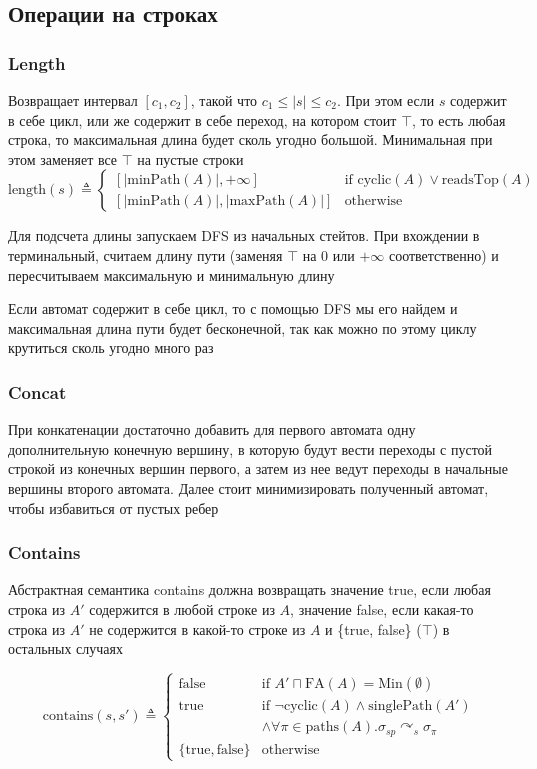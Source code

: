 \newpage
\subsection{Операции на строках}
\subsubsection*{Length}
Возвращает интервал $[c_1, c_2]$, такой что $c_1 \leq |s| \leq c_2$. При этом если $s$ содержит в себе цикл, или же содержит в себе переход, на котором стоит $\top$, то есть любая строка, то максимальная длина будет сколь угодно большой. Минимальная при этом заменяет все $\top$ на пустые строки
$$
\text{length}(s) \triangleq 
\begin{cases}
[\lvert \text{minPath}(A) \rvert, +\infty] & \text{if } \text{cyclic}(A) \lor \text{readsTop}(A) \\
[\lvert \text{minPath}(A) \rvert, \lvert \text{maxPath}(A) \rvert] & \text{otherwise}
\end{cases}
$$

Для подсчета длины запускаем DFS из начальных стейтов. При вхождении в терминальный, считаем длину пути (заменяя $\top$ на $0$ или $+\infty$ соответственно) и пересчитываем максимальную и минимальную длину

Если автомат содержит в себе цикл, то с помощью DFS мы его найдем и максимальная длина пути будет бесконечной, так как можно по этому циклу крутиться сколь угодно много раз

\subsubsection*{Concat}
При конкатенации достаточно добавить для первого автомата одну дополнительную конечную вершину, в которую будут вести переходы с пустой строкой из конечных вершин первого, а затем из нее ведут переходы в начальные вершины второго автомата. Далее стоит минимизировать полученный автомат, чтобы избавиться от пустых ребер

\newpage
\subsubsection*{Contains}
Абстрактная семантика contains должна возвращать значение true, если любая строка из $A'$ содержится в любой строке из $A$, значение false, если какая-то строка из $A'$ не содержится в какой-то строке из $A$ и \{true, false\} ($\top$) в остальных случаях

$$
\text{contains}(s, s') \triangleq 
\begin{cases}
\text{false} & \text{if } A' \sqcap \text{FA}(A) = \text{Min}(\emptyset) \\
\text{true} & \text{if } \neg \text{cyclic}(A) \land \text{singlePath}(A') \\
& \land \forall \pi \in \text{paths}(A). \sigma_{sp} \curvearrowright_s \sigma_{\pi} \\
\{ \text{true}, \text{false} \} & \text{otherwise}
\end{cases}
$$

